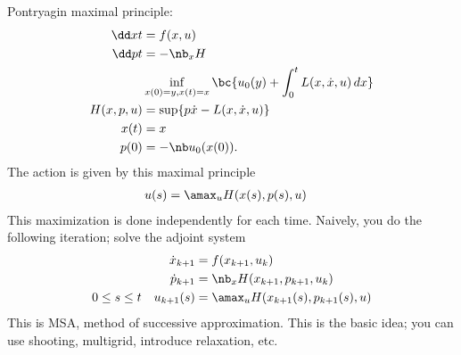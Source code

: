 Pontryagin maximal principle:
\begin{align}
\dd xt &= f(x,u) \\
\dd pt &= -\nb_x H\\
& \inf_{x(0)=y, x(t)=x} \bc{u_0 (y) + \int_0^t L(x,\dot x, u)\,dx}\\
H(x,p,u) &= \sup\{p \dot x- L(x,\dot x, u)\}\\
x(t)&=x\\
p(0)&=-\nb u_0(x(0)).
\end{align} %
The action is given by this maximal principle
\begin{align}
u(s) &= \amax_u H(x(s),p(s),u)
\end{align}
This maximization is done independently for each time.
Naively, you do the following iteration; solve the adjoint system
\begin{align}
\dot x_{k+1}&= f(x_{k+1},u_k)\\
\dot p_{k+1}&= \nb_x H(x_{k+1},p_{k+1},u_k)\\
0\le s\le t\quad
u_{k+1}(s) &=\amax_u H(x_{k+1}(s), p_{k+1}(s),u)
\end{align}
This is MSA, method of successive approximation. This is the basic idea; you can use shooting, multigrid,  introduce relaxation, etc.